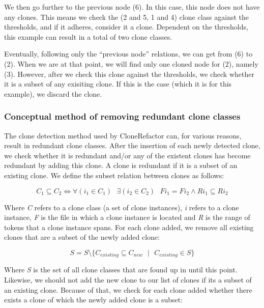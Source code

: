 We then go further to the previous node (6). In this case, this node does not have any clones. This means we check the (2 and 5, 1 and 4) clone class against the thresholds, and if it adheres, consider it a clone. Dependent on the thresholds, this example can result in a total of two clone classes.

Eventually, following only the ``previous node'' relations, we can get from (6) to (2). When we are at that point, we will find only one cloned node for (2), namely (3). However, after we check this clone against the thresholds, we check whether it is a subset of any exisiting clone. If this is the case (which it is for this example), we discard the clone.

\subsubsection{Conceptual method of removing redundant clone classes}
The clone detection method used by CloneRefactor can, for various reasons,%
result in redundant clone classes. After the insertion of each newly detected clone, we check whether it is redundant and/or any of the existent clones has become redundant by adding this clone. A clone is redundant if it is a subset of an existing clone. We define the subset relation between clones as follows:

\begin{equation}\label{eq:subset}
C_1 \subseteq C_2 \Leftrightarrow \forall (i_1 \in C_1) \text{ } \exists (i_2 \in C_2) \text{ } F i_1 = F i_2 \wedge R i_1 \subseteq R i_2
\end{equation}

Where \textit{C} refers to a clone class (a set of clone instances), \textit{i} refers to a clone instance, \textit{F} is the file in which a clone instance is located and \textit{R} is the range of tokens that a clone instance spans. For each clone added, we remove all existing clones that are a subset of the newly added clone:

\begin{equation}\label{eq:removeall}
S = S \setminus \{C_{existing} \subseteq C_{new}\text{ }|\text{ }C_{existing} \in S\}
\end{equation}

Where \textit{S} is the set of all clone classes that are found up in until this point. Likewise, we should not add the new clone to our list of clones if its a subset of an existing clone. Because of that, we check for each clone added whether there exists a clone of which the newly added clone is a subset:

